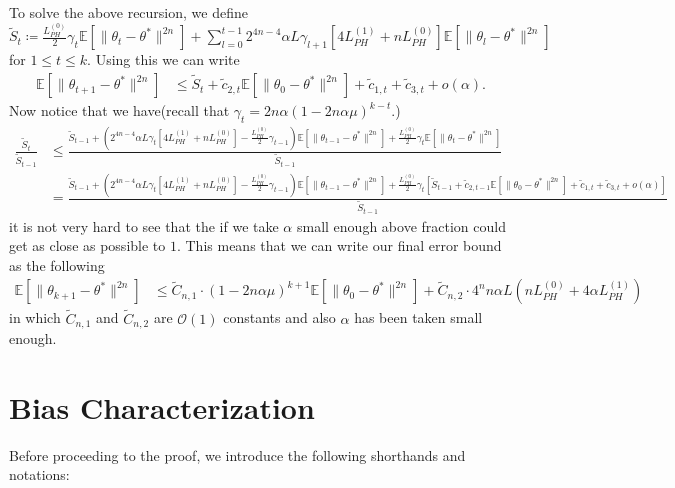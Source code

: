 \documentclass[a4paper]{article}
\newcommand{\norm}[1]{\|#1 \|}
\newcommand{\Exs}{\mathbb{E}}
\newcommand{\thetastar}{\theta^*}
\newcommand{\constLPH}[1]{L_{PH}^{(#1)}}
\newcommand{\stepsize}{\alpha}
\begin{document}
	To solve the above recursion, we define $\tilde{S}_{t} \coloneq \frac{\constLPH{0}}{2}\gamma_{t}\Exs\left[\norm{\theta_{t} - \thetastar}^{2n}\right] + \sum_{l = 0}^{t - 1}2^{4n - 4}\stepsize L \gamma_{l + 1}\left[4\constLPH{1} + n\constLPH{0}\right]\Exs\left[\norm{\theta_{l} - \thetastar}^{2n}\right]$ for $1 \leq t \leq k$. Using this we can write
	\begin{align*}
		\Exs\left[\norm{\theta_{t + 1} - \thetastar}^{2n}\right] & \leq \tilde{S}_{t} + \tilde{c}_{2, t}\Exs\left[\norm{\theta_{0} - \thetastar}^{2n}\right] + \tilde{c}_{1, t} + \tilde{c}_{3, t} + o\left(\stepsize\right).
	\end{align*}
	Now notice that we have(recall that $\gamma_{t} = 2n\stepsize\left(1 - 2n\stepsize\mu\right)^{k - t}$.)
	\begin{align*}
		\frac{\tilde{S}_{t}}{\tilde{S}_{t - 1}} &‌ \leq \frac{\tilde{S}_{t - 1} + \left(2^{4n - 4}\stepsize L \gamma_{t}\left[4\constLPH{1} + n\constLPH{0}\right] - \frac{\constLPH{0}}{2}\gamma_{t - 1}\right)\Exs\left[\norm{\theta_{t - 1} - \thetastar}^{2n}\right] + \frac{\constLPH{0}}{2}\gamma_{t}\Exs\left[\norm{\theta_{t} - \thetastar}^{2n}\right]}{\tilde{S}_{t - 1}}\\
		& = \frac{\tilde{S}_{t - 1} + \left(2^{4n - 4}\stepsize L \gamma_{t}\left[4\constLPH{1} + n\constLPH{0}\right] - \frac{\constLPH{0}}{2}\gamma_{t - 1}\right)\Exs\left[\norm{\theta_{t - 1} - \thetastar}^{2n}\right] + \frac{\constLPH{0}}{2}\gamma_{t}\left[\tilde{S}_{t - 1} + \tilde{c}_{2, t - 1}\Exs\left[\norm{\theta_{0} - \thetastar}^{2n}\right] + \tilde{c}_{1, t} + \tilde{c}_{3, t} + o\left(\stepsize\right)\right]}{\tilde{S}_{t - 1}}
	\end{align*}
	it is not very hard to see that the if we take $\stepsize$ small enough above fraction could get as close as possible to $1$. This means that we can write our final error bound as the following
	\begin{align*}
		\Exs\left[\norm{\theta_{k +‌ 1} - \thetastar}^{2n}\right] & \leq \tilde{C}_{n, 1} \cdot \left(1 - 2n\stepsize\mu\right)^{k + 1}\Exs\left[\norm{\theta_{0} - \thetastar}^{2n}\right] + \tilde{C}_{n, 2} \cdot 4^{n}n\stepsize L\left(n\constLPH{0} + 4\stepsize \constLPH{1}\right)
	\end{align*}
	in which $\tilde{C}_{n, 1}$ and $\tilde{C}_{n, 2}$ are $\mathcal{O}(1)$ constants and also $\stepsize$ has been taken small enough.
	
	\section{Bias Characterization}
	Before proceeding to the proof, we introduce the following shorthands and notations:
	
\end{document}
